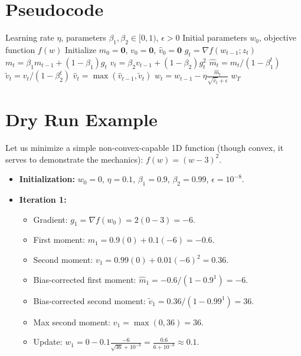 \documentclass{article}
\begin{document}
\section*{Pseudocode}
\begin{algorithm}[H]
\caption{AMSGrad}
\begin{algorithmic}[1]
\REQUIRE Learning rate $\eta$, parameters $\beta_1, \beta_2 \in [0, 1)$, $\epsilon > 0$
\REQUIRE Initial parameters $w_0$, objective function $f(w)$
\STATE Initialize $m_0 = \mathbf{0}$, $v_0 = \mathbf{0}$, $\hat{v}_0 = \mathbf{0}$
    \STATE $g_t = \nabla f(w_{t-1}; z_t)$ \quad {}
    \STATE $m_t = \beta_1 m_{t-1} + (1-\beta_1) g_t$
    \STATE $v_t = \beta_2 v_{t-1} + (1-\beta_2) g_t^2$
    \STATE $\hat{m}_t = m_t / (1 - \beta_1^t)$
    \STATE $\tilde{v}_t = v_t / (1 - \beta_2^t)$
    \STATE $\hat{v}_t = \max(\hat{v}_{t-1}, \tilde{v}_t)$ \quad {}
    \STATE $w_t = w_{t-1} - \eta \frac{\hat{m}_t}{\sqrt{\hat{v}_t} + \epsilon}$
\ENDFOR
\RETURN $w_T$
\end{algorithmic}
\end{algorithm}

\section*{Dry Run Example}
Let us minimize a simple non-convex-capable 1D function (though convex, it serves to demonstrate the mechanics): $f(w) = (w-3)^2$.
\begin{itemize}
    \item \textbf{Initialization:} $w_0 = 0$, $\eta = 0.1$, $\beta_1 = 0.9$, $\beta_2 = 0.99$, $\epsilon = 10^{-8}$.
    \item \textbf{Iteration 1:}
    \begin{itemize}
        \item Gradient: $g_1 = \nabla f(w_0) = 2(0-3) = -6$.
        \item First moment: $m_1 = 0.9(0) + 0.1(-6) = -0.6$.
        \item Second moment: $v_1 = 0.99(0) + 0.01(-6)^2 = 0.36$.
        \item Bias-corrected first moment: $\hat{m}_1 = -0.6 / (1-0.9^1) = -6$.
        \item Bias-corrected second moment: $\tilde{v}_1 = 0.36 / (1-0.99^1) = 36$.
        \item Max second moment: $\hat{v}_1 = \max(0, 36) = 36$.
        \item Update: $w_1 = 0 - 0.1 \frac{-6}{\sqrt{36} + 10^{-8}} = \frac{0.6}{6 + 10^{-8}} \approx 0.1$.
    \end{itemize}
\end{itemize}
\end{document}

